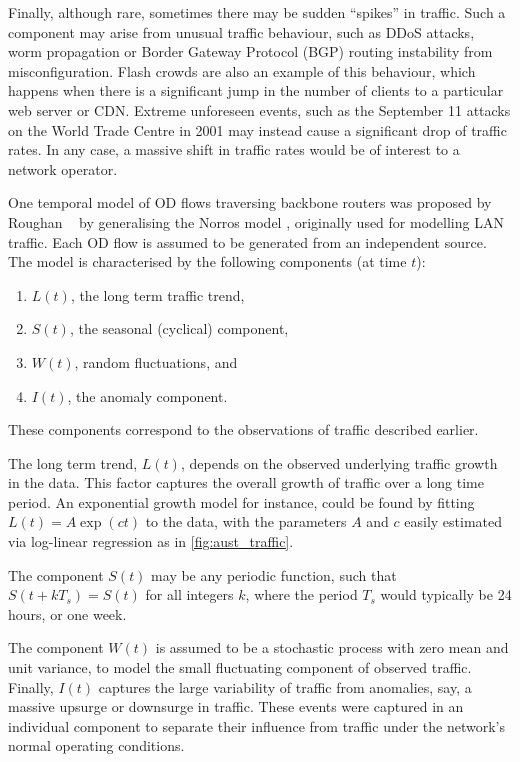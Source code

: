 Finally, although rare, sometimes there may be sudden ``spikes'' in
traffic.  Such a component may arise from unusual traffic behaviour,
such as DDoS attacks, worm propagation or Border Gateway Protocol (BGP) 
routing instability from misconfiguration. Flash crowds are also an example of this behaviour,
which happens when there is a significant jump in the number of
clients to a particular web server or CDN. 
Extreme unforeseen events, such as the September 11 attacks on
the World Trade Centre in 2001 may instead cause a significant drop of
traffic rates. In any case, a massive shift in traffic rates would be
of interest to a network operator.

One temporal model of OD flows traversing backbone routers was
proposed by Roughan \etal~\cite{Roughan02BRvariable} by generalising
the Norros model \cite{Norros94Storage}, originally used for modelling
LAN traffic. Each OD flow is assumed to be generated from an
independent source. The model is characterised by the following
components (at time $t$):
\begin{enumerate}
\item $L(t)$, the long term traffic trend,
\item $S(t)$, the seasonal (cyclical) component, 
\item $W(t)$, random fluctuations, and
\item $I(t)$, the anomaly component.
\end{enumerate}
These components correspond to the observations of traffic described earlier.

The long term trend, $L(t)$, depends on the observed underlying
traffic growth in the data. This factor captures the overall growth of traffic over
a long time period. An exponential growth model for instance,
could be found by fitting $L(t) = A \exp(ct)$ to the data, with the
parameters $A$ and $c$ easily estimated via log-linear regression as
in \autoref{fig:aust_traffic}. 

The component $S(t)$ may be any periodic function, such that
$S(t+kT_s) = S(t)$ for all integers $k$, where the period $T_s$ would
typically be 24 hours, or one week. 

The component $W(t)$ is assumed to be a stochastic process with
zero mean and unit variance, to model the small fluctuating component of 
observed traffic. Finally, $I(t)$ captures the large variability of traffic from
anomalies, say, a massive upsurge or downsurge in traffic. These events were 
captured in an individual component to separate their influence from 
traffic under the network's normal operating conditions.

